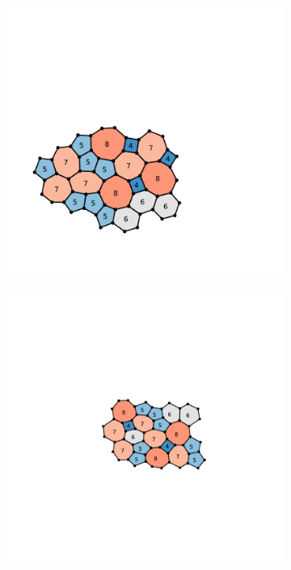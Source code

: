 \begin{figure}[h]
     \begin{subfigure}[b]{0.25\textwidth}
         \centering
         \includegraphics[width=\textwidth]{./figures/introduction/zach_orig.pdf}
         \caption{}
         \label{fig:zach_orig}
     \end{subfigure}
     \hspace{1cm}
     \begin{subfigure}[b]{0.25\textwidth}
         \centering
         \includegraphics[width=\textwidth]{./figures/introduction/zach_high.pdf}
         \caption{}
         \label{fig:zach_high}
     \end{subfigure}
     

\end{figure}

